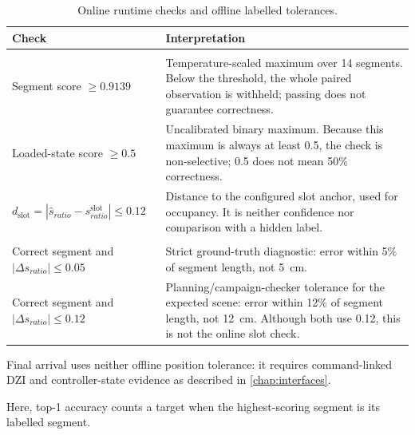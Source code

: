 \begin{table}[htbp]
\centering
\small
\setlength{\tabcolsep}{5pt}
\renewcommand{\arraystretch}{1.05}
\caption{Online runtime checks and offline labelled tolerances.}
\label{tab:visual-threshold-map}
\begin{tabularx}{\textwidth}{@{}
>{\raggedright\arraybackslash}p{}X@{}}
\toprule
\textbf{Check} & \textbf{Interpretation}\\
\midrule
\multicolumn{2}{@{}l}{\textbf{Online runtime checks}}\\
Segment score $\geq0.9139$ & Temperature-scaled maximum over 14 segments. Below
the threshold, the whole paired observation is withheld; passing does not
guarantee correctness.\\
\tablerowrule
Loaded-state score $\geq0.5$ & Uncalibrated binary maximum. Because this maximum
is always at least 0.5, the check is non-selective; 0.5 does not mean 50\%
correctness.\\
\tablerowrule
$d_{\mathrm{slot}}=|\hat{s}_{ratio}-s^{\mathrm{slot}}_{ratio}|\leq0.12$ &
Distance to the configured slot anchor, used for occupancy. It is neither
confidence nor comparison with a hidden label.\\
\tablerowrule
\multicolumn{2}{@{}l}{\textbf{Offline labelled tolerances}}\\
Correct segment and $|\Delta s_{ratio}|\leq0.05$ & Strict ground-truth
diagnostic: error within 5\% of segment length, not \SI{5}{cm}.\\
\tablerowrule
Correct segment and $|\Delta s_{ratio}|\leq0.12$ & Planning/campaign-checker
tolerance for the expected scene: error within 12\% of segment length, not
\SI{12}{cm}. Although both use 0.12, this is not the online slot check.\\
\bottomrule
\end{tabularx}
\end{table}

Final arrival uses neither offline position tolerance: it requires
command-linked DZI and controller-state evidence as described in
\cref{chap:interfaces}.

Here, top-1 accuracy counts a target when the highest-scoring segment is its
labelled segment.

